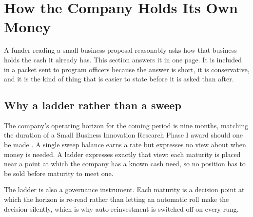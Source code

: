 \section{How the Company Holds Its Own Money}

A funder reading a small business proposal reasonably asks how that business
holds the cash it already has. This section answers it in one page. It is
included in a packet sent to program officers because the answer is short, it is
conservative, and it is the kind of thing that is easier to state before it is
asked than after.

\subsection{Why a ladder rather than a sweep}

The company's operating horizon for the coming period is nine months, matching
the duration of a Small Business Innovation Research Phase I award should one be
made \cite{nihsbirseed}. A single sweep balance earns a rate but expresses no
view about when money is needed. A ladder expresses exactly that view: each
maturity is placed near a point at which the company has a known cash need, so no
position has to be sold before maturity to meet one.

The ladder is also a governance instrument. Each maturity is a decision point at
which the horizon is re-read rather than letting an automatic roll make the
decision silently, which is why auto-reinvestment is switched off on every rung.

